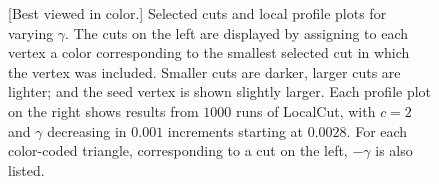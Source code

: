 \documentclass[11pt]{article}
\begin{document}
\begin{figure}[] 
\caption{[Best viewed in color.]  
Selected cuts and local profile plots for varying $\gamma$. 
The cuts on the left are displayed by assigning to each vertex a color 
corresponding to the smallest selected cut in which the vertex was included. 
Smaller cuts are darker, larger cuts are lighter; and the seed vertex is 
shown slightly larger. 
Each profile plot on the right shows results from $1000$ runs of 
\textsf{LocalCut}, with $c=2$ and $\gamma$ decreasing in $0.001$ increments 
starting at $0.0028$.
For each color-coded triangle, corresponding to a cut on the left, $-\gamma$ 
is also listed.
}
\label{fig:teleportation}
\end{figure}
\end{document}
